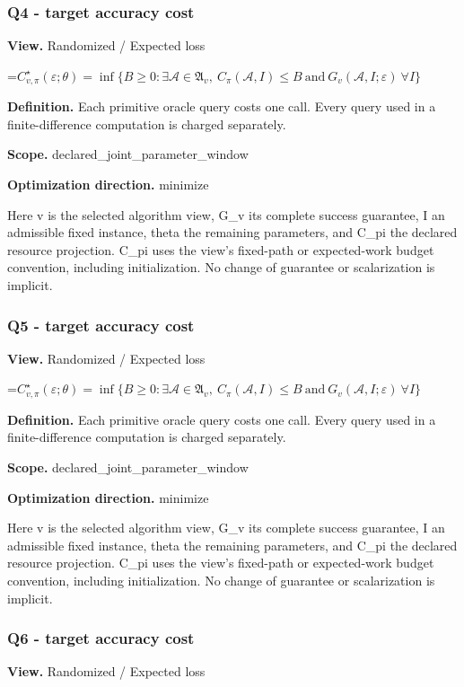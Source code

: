 \documentclass[10pt,a4paper]{article}
\newcommand{\AtlasMath}[1]{\par\begingroup\centering\setbox0=\hbox{$\displaystyle #1$}\ifdim\wd0>1.4\linewidth\typeout{ATLAS WIDE FORMULA: \the\wd0}\fi\ifdim\wd0>\linewidth\resizebox{\linewidth}{!}{\box0}\else\box0\fi\par\endgroup}
\begin{document}
\subsubsection{Q4 - target accuracy cost}
\textbf{View.} Randomized / Expected loss

\AtlasMath{C^\star_{v,\pi}(\varepsilon;\theta)=\inf\{B\ge0:\exists\mathcal A\in\mathfrak A_v,\ C_\pi(\mathcal A,I)\le B\ \text{and}\ G_v(\mathcal A,I;\varepsilon)\ \forall I\}}
\textbf{Definition.} Each primitive oracle query costs one call. Every query used in a finite-difference computation is charged separately.

\textbf{Scope.} declared\_joint\_parameter\_window

\textbf{Optimization direction.} minimize

Here v is the selected algorithm view, G\_v its complete success guarantee, I an admissible fixed instance, theta the remaining parameters, and C\_pi the declared resource projection. C\_pi uses the view's fixed-path or expected-work budget convention, including initialization. No change of guarantee or scalarization is implicit.

\subsubsection{Q5 - target accuracy cost}
\textbf{View.} Randomized / Expected loss

\AtlasMath{C^\star_{v,\pi}(\varepsilon;\theta)=\inf\{B\ge0:\exists\mathcal A\in\mathfrak A_v,\ C_\pi(\mathcal A,I)\le B\ \text{and}\ G_v(\mathcal A,I;\varepsilon)\ \forall I\}}
\textbf{Definition.} Each primitive oracle query costs one call. Every query used in a finite-difference computation is charged separately.

\textbf{Scope.} declared\_joint\_parameter\_window

\textbf{Optimization direction.} minimize

Here v is the selected algorithm view, G\_v its complete success guarantee, I an admissible fixed instance, theta the remaining parameters, and C\_pi the declared resource projection. C\_pi uses the view's fixed-path or expected-work budget convention, including initialization. No change of guarantee or scalarization is implicit.

\subsubsection{Q6 - target accuracy cost}
\textbf{View.} Randomized / Expected loss
\end{document}
